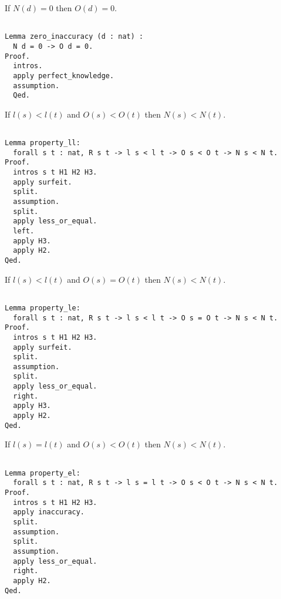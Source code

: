 If $N(d) = 0$ then $O(d) = 0$.

\begin{sourcecode}
{\scriptsize \begin{verbatim}

Lemma zero_inaccuracy (d : nat) :
  N d = 0 -> O d = 0.
Proof.
  intros.
  apply perfect_knowledge.
  assumption.
  Qed.

\end{verbatim}}
\end{sourcecode}

If $l(s) < l(t)$ and $O(s) < O(t)$ then $N(s) < N(t)$.

\begin{sourcecode}
{\scriptsize \begin{verbatim}

Lemma property_ll:
  forall s t : nat, R s t -> l s < l t -> O s < O t -> N s < N t.
Proof.
  intros s t H1 H2 H3.
  apply surfeit.
  split.
  assumption.
  split.
  apply less_or_equal.
  left.
  apply H3.
  apply H2.
Qed.

\end{verbatim}}
\end{sourcecode}

If $l(s) < l(t)$ and $O(s) = O(t)$ then $N(s) < N(t)$.

\begin{sourcecode}
{\scriptsize \begin{verbatim}

Lemma property_le:
  forall s t : nat, R s t -> l s < l t -> O s = O t -> N s < N t.
Proof.
  intros s t H1 H2 H3.
  apply surfeit.
  split.
  assumption.
  split.
  apply less_or_equal.
  right.
  apply H3.
  apply H2.
Qed.

\end{verbatim}}
\end{sourcecode}

If $l(s) = l(t)$ and $O(s) < O(t)$ then $N(s) < N(t)$.

\begin{sourcecode}
{\scriptsize \begin{verbatim}

Lemma property_el:
  forall s t : nat, R s t -> l s = l t -> O s < O t -> N s < N t.
Proof.
  intros s t H1 H2 H3.
  apply inaccuracy.
  split.
  assumption.
  split.
  assumption.
  apply less_or_equal.
  right.
  apply H2.
Qed.

\end{verbatim}}
\end{sourcecode}

